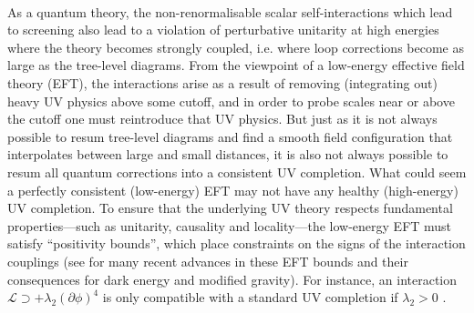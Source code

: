 \documentclass[11pt]{article}
\begin{document}
~

As a quantum theory, the non-renormalisable scalar self-interactions which lead to screening also lead to a violation of perturbative unitarity at high energies where the theory becomes strongly coupled, i.e. where loop corrections become as large as the tree-level diagrams. 
From the viewpoint of a low-energy effective field theory (EFT), 
the interactions arise as a result of removing (integrating out) heavy UV physics above some cutoff, and  in order to probe scales near or above the cutoff one must reintroduce that UV physics.
But just as it is not always possible to resum tree-level diagrams and find a smooth field configuration that interpolates between large and small distances, it is also not always possible to resum all quantum corrections into a consistent UV completion. 
What could seem a perfectly consistent (low-energy) EFT may not have any healthy (high-energy) UV completion. To ensure that the underlying UV theory respects fundamental properties---such as unitarity, causality and locality---the low-energy EFT must satisfy ``positivity bounds'', which place constraints on the signs of the interaction couplings (see \cite{Adams:2006sv,Jenkins:2006ia,  Adams:2008hp, Nicolis:2009qm, Bellazzini:2014waa, Bellazzini:2015cra, Baumann:2015nta,  Cheung:2016yqr,Bonifacio:2016wcb,deRham:2017avq,deRham:2017zjm,deRham:2018qqo,Bellazzini:2016xrt,deRham:2017imi,Bellazzini:2017fep,deRham:2017xox, Melville:2019tdc, Alberte:2019xfh, Alberte:2019zhd,Bellazzini:2020cot,Tolley:2020gtv,Caron-Huot:2020cmc, Arkani-Hamed:2020blm, Herrero-Valea:2020wxz, Alberte:2020jsk, Alberte:2020bdz, Wang:2020xlt} for many recent advances in these EFT bounds and their consequences for dark energy and modified gravity). For instance, an interaction $\mathcal{L} \supset + \lambda_2 (\partial \phi )^4$ is only compatible with a standard  UV completion if $\lambda_2 > 0$ \cite{Adams:2006sv}. 

~
\end{document}
